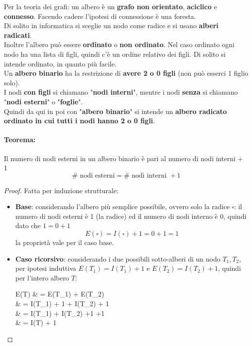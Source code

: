 Per la teoria dei grafi: un albero è un \textbf{grafo non orientato}, \textbf{aciclico} e \textbf{connesso}. Facendo cadere l'ipotesi di connessione è una foresta.\\
Di solito in informatica si sceglie un nodo come radice e si usano \textbf{alberi radicati}.\\

Inoltre l'albero può essere \textbf{ordinato} o \textbf{non ordinato}. Nel caso ordinato ogni nodo ha una lista di figli, quindi c'è un ordine relativo dei figli. Di solito si intende ordinato, in quanto più facile.\\

Un \textbf{albero binario} ha la restrizione di \textbf{avere 2 o 0 figli} (non può esserci 1 figlio solo).\\

I nodi \textbf{con figli} si chiamano "\textbf{nodi interni}", mentre i nodi \textbf{senza} si chiamano "\textbf{nodi esterni}" o "\textbf{foglie}".\\

Quindi da qui in poi con "\textbf{albero binario}" si intende un \textbf{albero radicato ordinato in cui tutti i nodi hanno 2 o 0 figli}.\\

\newpage

\paragraph{Teorema:} Il numero di nodi esterni in un albero binario è pari al numero di nodi interni + 1
$$ \# \text{ nodi esterni} = \# \text{ nodi interni } + 1 $$

\begin{proof}
	Fatta per induzione strutturale:
	\begin{itemize}
		\item \textbf{Base}: considerando l'albero più semplice possibile, ovvero solo la radice $\square$: il numero di nodi esterni è 1 (la radice) ed il numero di nodi interno è $0$, quindi dato che $1 = 0 + 1$
		$$ E(\square) = I(\square) + 1 = 0 + 1 = 1 $$
		la proprietà vale per il caso base.\\
		
		\item \textbf{Caso ricorsivo}: considerando i due possibili sotto-alberi di un nodo $T_1, T_2$, per ipotesi induttiva $E(T_1) = I(T_1) + 1$ e $E(T_2) = I(T_2) + 1$, quindi per l'intero albero $T$:
		\begin{flalign*}
			E(T) & = E(T_1) + E(T_2)  \\
			& = I(T_1) + 1 + I(T_2) + 1 \\
			& = I(T_1) + I(T_2) +1 +1 \\
			& = I(T) + 1
		\end{flalign*}
	\end{itemize}
	
\end{proof}

